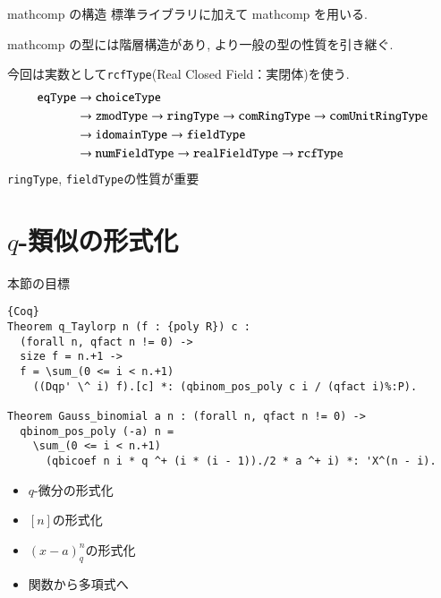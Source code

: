 \documentclass[dvipdfmx,cjk]{beamer}
\theoremstyle{mystyle}
\newcommand{\0}{\textbf{0}}
\begin{document}

\begin{frame}{mathcomp の構造}
	標準ライブラリ\cite{coq sl}に加えて mathcomp \cite{coq mc}を用いる. \pause
	
	mathcomp の型には階層構造があり, より一般の型の性質を引き継ぐ. \pause
	
	今回は実数として{\tt rcfType}(Real Closed Field：実閉体)を使う. \pause
	\begin{align*}
		{\tt eqType} &\to {\tt choiceType} \\
		                  &\to {\tt zmodType} \to {\tt ringType} \to 
		                          {\tt comRingType} \to {\tt comUnitRingType}\\
							  &\to {\tt idomainType} \to {\tt fieldType}\\
		                  &\to {\tt numFieldType} \to {\tt realFieldType} \to {\tt rcfType}
	\end{align*} \pause
	{\tt ringType}, {\tt fieldType}の性質が重要
\end{frame}
\section{$q$-類似の形式化}

\begin{frame}
  \tableofcontents[currentsection] 
\end{frame}

\begin{frame}[fragile]{本節の目標} \pause
	\begin{lstlisting}{Coq}
Theorem q_Taylorp n (f : {poly R}) c :
  (forall n, qfact n != 0) ->
  size f = n.+1 ->
  f = \sum_(0 <= i < n.+1)
    ((Dqp' \^ i) f).[c] *: (qbinom_pos_poly c i / (qfact i)%:P).
    
Theorem Gauss_binomial a n : (forall n, qfact n != 0) ->
  qbinom_pos_poly (-a) n =
    \sum_(0 <= i < n.+1)
      (qbicoef n i * q ^+ (i * (i - 1))./2 * a ^+ i) *: 'X^(n - i). \end{lstlisting} \pause
	\begin{itemize}
		\item $q$-微分の形式化 \pause
		\item $[n]$の形式化 \pause
		\item $(x - a)^n_q$の形式化 \pause
		\item 関数から多項式へ
	\end{itemize}
\end{frame}
\end{document}
